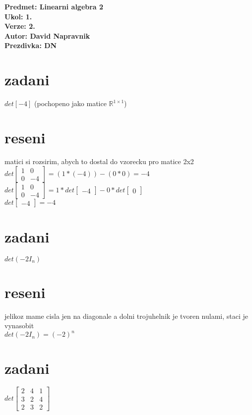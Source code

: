 \documentclass[a4paper]{article}
\begin{document}
\noindent
\textbf{Predmet: Linearni algebra 2}\\
\textbf{Ukol: 1.}\\
\textbf{Verze: 2.}\\
\textbf{Autor: David Napravnik}\\
\textbf{Prezdivka: DN}

\section*{zadani}
$det[-4]$ (pochopeno jako matice $\mathbb{R}^{1\times1}$)

\section*{reseni}
matici si rozsirim, abych to dostal do vzorecku pro matice 2x2\\
$
	det \left[ \begin{matrix} 1 & 0 \\ 0 & -4 \end{matrix} \right] =
	(1*(-4)) - (0*0) = -4
$\\
$
	det \left[ \begin{matrix} 1 & 0 \\ 0 & -4 \end{matrix} \right]=
	1 * det \left[ \begin{matrix} -4 \end{matrix} \right] -
	0 * det \left[ \begin{matrix} 0 \end{matrix} \right]
$\\
$
	det \left[ \begin{matrix} -4 \end{matrix} \right] = -4
$



\section*{zadani}
$det(-2I_n)$

\section*{reseni}
jelikoz mame cisla jen na diagonale a dolni trojuhelnik je tvoren nulami, staci je vynasobit\\
$det(-2I_n) = (-2)^n$



\section*{zadani}
$
det\left[ \begin{matrix} 2 & 4 & 1 \\ 3 & 2 & 4 \\ 2 & 3 & 2 \end{matrix} \right]
$
\end{document}

